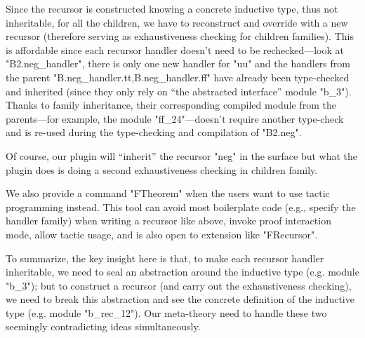 Since the recursor is constructed knowing a concrete inductive type,
thus not inheritable, for all the children, we have to reconstruct and
override with a new recursor (therefore serving as exhaustiveness
checking for children families). 
This is affordable since each recursor handler doesn't need
to be rechecked---look at "B2.neg_handler", there is only one new
handler for "uu" and the handlers from the parent
"B.neg_handler.tt,B.neg_handler.ff" have already been type-checked and
inherited (since they only rely on ``the abstracted
interface'' module "b_3"). 
Thanks to family inheritance, their corresponding compiled module from the parents---for example, 
the module "ff_24"---doesn't require another type-check and is re-used during the type-checking and compilation of "B2.neg".

Of course, our plugin will ``inherit'' the
recursor "neg" in the surface 
but what the plugin does is doing a second exhaustiveness
checking in children family.



We also provide a command "FTheorem" when the users want to use tactic
programming instead. This tool can avoid most boilerplate code (e.g.,
specify the handler family) when writing a recursor like above, invoke
proof interaction mode, allow tactic usage, and is also open to
extension like "FRecursor".

To summarize, the key insight here is that, to make each recursor
handler inheritable, we need to seal an abstraction around the inductive
type (e.g. module "b_3"); but to construct a recursor (and carry out the
exhaustiveness checking), we need to break this abstraction and see the
concrete definition of the inductive type (e.g. module "b_rec_12"). Our
meta-theory need to handle these two seemingly contradicting ideas
simultaneously. 


